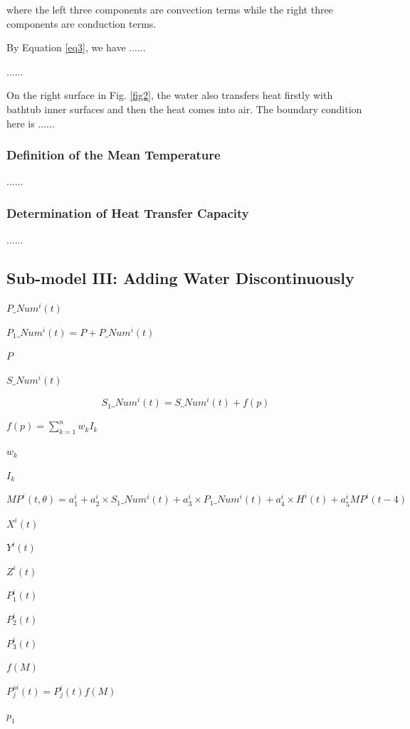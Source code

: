 \documentclass{mcmthesis}
\begin{document}
\noindent where the left three components are convection terms while the right three components are conduction terms.

By Equation \eqref{eq3}, we have ......

......

On the right surface in Fig. \ref{fig2}, the water also transfers heat firstly with bathtub inner surfaces and then the heat comes into air. The boundary condition here is ......

\subsubsection{Definition of the Mean Temperature}

......

\subsubsection{Determination of Heat Transfer Capacity}

......

\subsection{Sub-model III: Adding Water Discontinuously}
$P\_Num^{i}(t)$

$P_{1}\_Num^{i}(t) = P+P\_Num^{i}(t)$

$P$

$S\_Num^{i}(t)$

\begin{equation}
S_{1}\_Num^{i}(t) = S\_Num^{i}(t) + f(p)
\end{equation}

$f(p) = \sum_{k=1}^{n}w_{k}I_{k}$

$w_{k}$

$I_{k}$

$MP^{i}(t, \theta) = a_{1}^{i}+a_{2}^{i}\times S_{1}\_Num^{i}(t) + a_{3}^{i}\times P_{1}\_Num^{i}(t) + a_{4}^{i}\times H^{i}(t) + a_{5}^{i}MP^{i}(t-4)$

$X^{i}(t)$

$Y^{i}(t)$

$Z^{i}(t)$

$P_{1}^{i}(t)$

$P_{2}^{i}(t)$

$P_{3}^{i}(t)$

$f(M)$

$P_{j}^{oi}(t) = P_{j}^{i}(t)f(M)$

$p_{1}$
\end{document}
